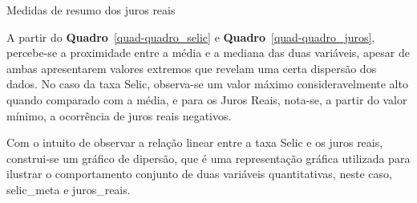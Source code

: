 \documentclass[
  portuguese,
]{estat/estat}
\begin{document}
\begin{quadro}[H]

\caption{\label{quad-quadro_juros}Medidas de resumo dos juros reais}


\end{quadro}%

A partir do \textbf{Quadro}~\ref{quad-quadro_selic} e
\textbf{Quadro}~\ref{quad-quadro_juros}, percebe-se a proximidade entre
a média e a mediana das duas variáveis, apesar de ambas apresentarem
valores extremos que revelam uma certa dispersão dos dados. No caso da
taxa Selic, observa-se um valor máximo consideravelmente alto quando
comparado com a média, e para os Juros Reais, nota-se, a partir do valor
mínimo, a ocorrência de juros reais negativos.

Com o intuito de observar a relação linear entre a taxa Selic e os juros
reais, construi-se um gráfico de dipersão, que é uma representação
gráfica utilizada para ilustrar o comportamento conjunto de duas
variáveis quantitativas, neste caso, selic\_meta e juros\_reais.
\end{document}
